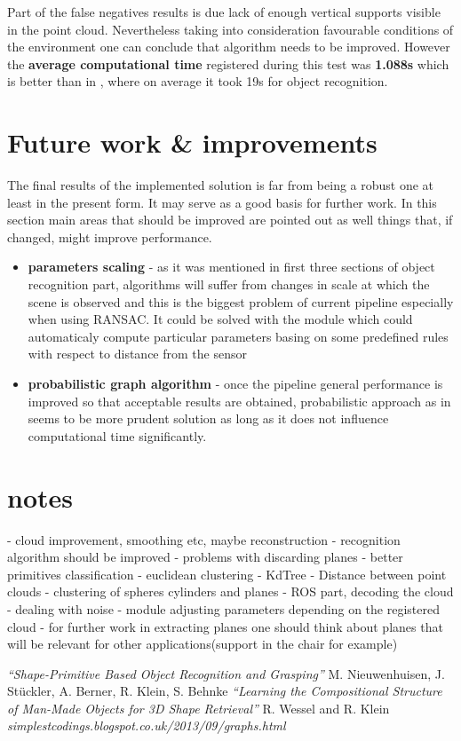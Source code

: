 \documentclass[12pt,oneside]{amsart}
\begin{document}
Part of the false negatives results is due lack of enough vertical supports visible in the point cloud. Nevertheless taking into consideration favourable conditions of the environment one can conclude that algorithm needs to be improved. However the \textbf{average computational time} registered during this test was \textbf{1.088s} which is better than in \cite{pap1}, where on average it took 19s for object recognition.
\section{Future work \& improvements}
The final results of the implemented solution is far from being a robust one at least in the present form. It may serve as a good basis for further work. In this section main areas that should be improved are pointed out as well things that, if changed, might improve performance.
\begin{itemize}
  \item \textbf{parameters scaling} - as it was mentioned in first three sections of object recognition part, algorithms will suffer from changes in scale at which the scene is observed and this is the biggest problem of current pipeline especially when using RANSAC. It could be solved with the module which could automaticaly compute particular parameters basing on some predefined rules with respect to distance from the sensor
  \item \textbf{probabilistic graph algorithm} - once the pipeline general performance is improved so that acceptable results are obtained, probabilistic approach as in \cite{pap1} seems to be more prudent solution as long as it does not influence computational time significantly.
\end{itemize}

\section{notes}
- cloud improvement, smoothing etc, maybe reconstruction
- recognition algorithm should be improved
- problems with discarding planes 
- better primitives classification
- euclidean clustering
- KdTree
- Distance between point clouds
- clustering of spheres cylinders and planes
- ROS part, decoding the cloud
- dealing with noise
- module adjusting parameters depending on the registered cloud
- for further work in extracting planes one should think about planes that will be relevant for other applications(support in the chair for example)

\begin{thebibliography}{1}
   \emph{“Shape-Primitive Based Object Recognition and Grasping”} M. Nieuwenhuisen, J. Stückler, A. Berner, R. Klein, S. Behnke
   \emph{“Learning the Compositional Structure of Man-Made Objects for 3D Shape Retrieval”} R. Wessel and R. Klein
   \emph{simplestcodings.blogspot.co.uk/2013/09/graphs.html}
\end{thebibliography}
\end{document}
